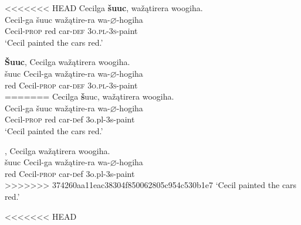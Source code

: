 \documentclass[output=paper]{LSP/langsci}
\begin{document}
\begin{exe}
\begin{exe}
\ex
\begin{xlist}

<<<<<<< HEAD
\ex \glll Cecilga \textbf{šuuc}, wažątirera woogiha. \\
 Cecil-ga šuuc  wažątire-ra wa-{$\varnothing$}-hogiha\\
 Cecil-\textsc{prop} red car-\textsc{def} \textsc{3o.pl}-\textsc{3s}-paint \\
\glt `Cecil painted the cars red.'

\ex \glll \textbf{\v{S}uuc}, Cecilga wažątirera woogiha. \\
  šuuc Cecil-ga wažątire-ra wa-{$\varnothing$}-hogiha\\
red Cecil-\textsc{prop} car-\textsc{def} \textsc{3o.pl}-\textsc{3s}-paint \\
=======
\ex \glll Cecilga {\textbf \v{s}uuc}, wa\v{z}\k{a}tirera woogiha. \\
 Cecil-ga \v{s}uuc  wa\v{z}\k{a}tire-ra wa-$\varnothing$-hogiha\\
 Cecil-\textsc{prop} red car-{\textsc def} {\textsc 3o.pl}-{\textsc 3s}-paint \\
\glt `Cecil painted the cars red.'

\ex {}, Cecilga wa\v{z}\k{a}tirera woogiha. \\
  \v{s}uuc Cecil-ga wa\v{z}\k{a}tire-ra wa-$\varnothing$-hogiha\\
red Cecil-\textsc{prop} car-{\textsc def} {\textsc 3o.pl}-{\textsc 3s}-paint \\
>>>>>>> 374260aa11eac38304f850062805c954c530b1e7
\glt `Cecil painted the cars red.'

\end{xlist}


<<<<<<< HEAD
\end{exe}
\end{exe}
\end{document}
